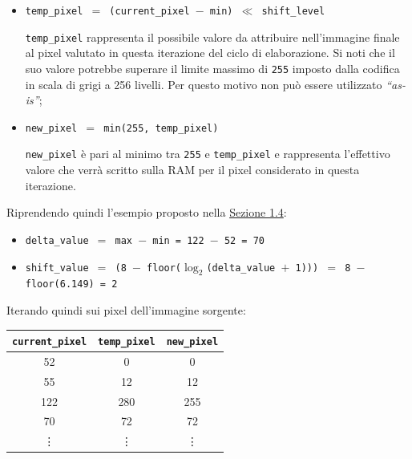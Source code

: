 \documentclass{article}
\begin{document}
\begin{itemize}
    \item   \texttt{temp\_pixel $=$ (current\_pixel $-$ min) $\ll$ shift\_level}\par
          \texttt{temp\_pixel} rappresenta il possibile valore da attribuire nell’immagine finale al pixel valutato in questa iterazione del ciclo di elaborazione. Si noti che il suo valore potrebbe superare il limite massimo di \texttt{255} imposto dalla codifica in scala di grigi a 256 livelli. Per questo motivo non può essere utilizzato \emph{“as-is”};
    \item   \texttt{new\_pixel $=$ min(255, temp\_pixel)}\par
          \texttt{new\_pixel} è pari al minimo tra \texttt{255} e \texttt{temp\_pixel} e rappresenta l’effettivo valore che verrà scritto sulla RAM per il pixel considerato in questa iterazione.
\end{itemize}

Riprendendo quindi l'esempio proposto nella \hyperref[sec:esempio]{Sezione 1.4}:
\begin{itemize}
    \item   \texttt{delta\_value $=$ max $-$ min = 122 $-$ 52 = 70}
    \item   \texttt{shift\_value $=$ (8 $-$ floor($\log_{2} $(delta\_value $+$ 1))) $=$ 8 $-$ floor(6.149) = 2}
\end{itemize}

Iterando quindi sui pixel dell'immagine sorgente:
\vspace{-.1cm}
\begin{center}
    \small
    \def\arraystretch{1.2} %
    \begin{tabular}{||c|c|c||}
        \hline
        \texttt{current\_pixel} & \texttt{temp\_pixel} & \texttt{new\_pixel} \\
        \hline \hline
        52                      & 0                    & 0                   \\\hline
        55                      & 12                   & 12                  \\\hline
        122                     & 280                  & 255                 \\\hline
        70                      & 72                   & 72                  \\\hline
        \vdots                  & \vdots               & \vdots              \\\hline
    \end{tabular}
\end{center}
\vspace{.1cm}
\end{document}
